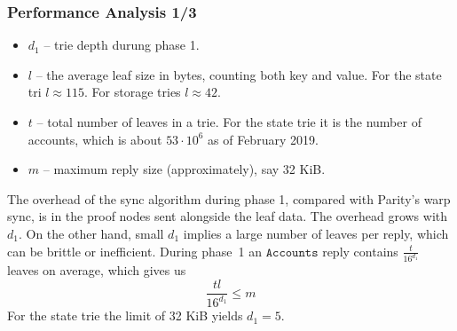 \documentclass{beamer}
\begin{document}
\begin{frame}
    

\end{frame} 

\begin{frame}
  \frametitle{Performance Analysis 1/3}

  \begin{itemize}
  \item $d_1$ -- trie depth durung phase 1.

  \item $l$ -- the average leaf size in bytes, counting both key and value.
  For the state tri $l \approx 115$.
  For storage tries $l \approx 42$.
  
  \item $t$ -- total number of leaves in a trie.
  For the state trie it is the number of accounts,
  which is about $53 \cdot 10^6$ as of February 2019.

  \item $m$ -- maximum reply size (approximately), say 32 KiB.
  \end{itemize}

  \bigskip
  
  The overhead of the sync algorithm during phase 1, compared with Parity's warp sync, is in the proof nodes sent alongside the leaf data.
The overhead grows with $d_1$.
On the other hand, small $d_1$ implies a large number of leaves per reply, which can be brittle or inefficient.
During phase~1 an $\texttt{Accounts}$ reply
contains $\frac{t}{16^{d_1}}$ leaves on average,
which gives us
\begin{equation}
    \frac{tl}{16^{d_1}} \leq m
\end{equation}
For the state trie the limit of 32 KiB yields $d_1 = 5$.

\end{frame}
\end{document}
